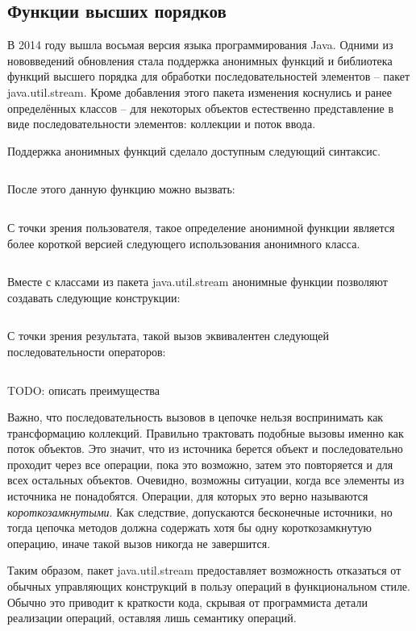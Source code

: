\subsection{Функции высших порядков} %
В 2014 году вышла восьмая версия языка программирования Java. Одними из нововведений обновления 
стала поддержка анонимных функций и библиотека функций высшего порядка для обработки 
последовательностей элементов -- пакет java.util.stream. Кроме добавления этого пакета 
изменения коснулись и ранее определённых классов -- для некоторых объектов естественно 
представление в виде последовательности элементов: коллекции и поток ввода.

Поддержка анонимных функций сделало доступным следующий синтаксис.
\inputminted{java}{chapter1/code/Lambda.java}

После этого данную функцию можно вызвать:
\inputminted{java}{chapter1/code/UseLambda.java}

С точки зрения пользователя, такое определение анонимной функции является более короткой версией следующего использования анонимного класса.

\inputminted{java}{chapter1/code/SameAnonymous.java}

Вместе с классами из пакета java.util.stream анонимные функции позволяют создавать следующие конструкции:

\inputminted{java}{chapter1/code/StreamUsage.java}

С точки зрения результата, такой вызов эквивалентен следующей последовательности операторов: 

\inputminted{java}{chapter1/code/CyclesUsage.java}

TODO: описать преимущества

Важно, что последовательность вызовов в цепочке нельзя воспринимать как трансформацию коллекций. Правильно трактовать подобные вызовы именно как поток объектов. Это значит, что из источника берется объект и последовательно проходит через все операции, пока это возможно, затем это повторяется и для всех остальных объектов. Очевидно, возможны ситуации, когда все элементы из источника не понадобятся. Операции, для которых это верно называются \textit{короткозамкнутыми}. Как следствие, допускаются бесконечные источники, но тогда цепочка методов должна содержать хотя бы одну короткозамкнутую операцию, иначе такой вызов никогда не завершится.

Таким образом, пакет java.util.stream предоставляет возможность отказаться от обычных управляющих конструкций в пользу операций в функциональном стиле. Обычно это приводит к краткости кода, скрывая от программиста детали реализации операций, оставляя лишь семантику операций.

